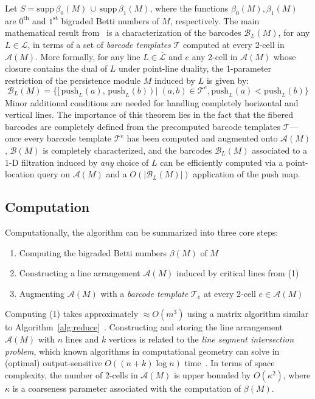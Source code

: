 \documentclass[sn-mathphys]{sn-jnl}
\begin{document}
Let $S = \mathrm{supp}\,\beta_0(M) \, \cup \, \mathrm{supp}\,\beta_1(M)$, where the functions $\beta_0(M), \beta_1(M)$ are $0^{\text{th}}$ and $1^{\text{st}}$ bigraded Betti numbers of $M$, respectively. 
The main mathematical result from~\cite{lesnick2015interactive} is a characterization of the barcodes $\mathcal{B}_L(M)$, for any $L \in \mathcal{L}$, in terms of a set of \emph{barcode templates} $\mathcal{T}$ computed at every 2-cell in $\mathcal{A}(M)$.
 More formally, for any line $L \in \overline{\mathcal{L}}$ and $e$ any 2-cell in $\mathcal{A}(M)$ whose closure contains the dual of $L$ under point-line duality, the 1-parameter restriction of the persistence module $M$ induced by $L$ is given by: 
 \begin{equation}
 \mathcal{B}_L(M) = \{ [\,\mathrm{push}_L(a), \, \mathrm{push}_L(b)\,) \mid (a,b) \in \mathcal{T}^e, \mathrm{push}_L(a) < \mathrm{push}_L(b)  \} 
\end{equation}
Minor additional conditions are needed for handling completely horizontal and vertical lines. 
The importance of this theorem lies in the fact that the fibered barcodes are completely defined from the precomputed barcode templates $\mathcal{T}$---once every barcode template $\mathcal{T}^e$ has been computed and augmented onto $\mathcal{A}(M)$, $\mathcal{B}(M)$ is completely characterized, and the barcodes $\mathcal{B}_L(M)$ associated to a 1-D filtration induced by \emph{any} choice of $L$ can be efficiently computed via a point-location query on $\mathcal{A}(M)$ and a $O(\lvert \mathcal{B}_L(M) \rvert)$ application of the push map.

\subsection{Computation}
Computationally, the algorithm can be summarized into three core steps: 
\begin{enumerate}
	\item Computing the bigraded Betti numbers $\beta(M)$ of $M$
	\item Constructing a line arrangement $\mathcal{A}(M)$ induced by critical lines from (1) 
	\item Augmenting $\mathcal{A}(M)$ with a \emph{barcode template} $\mathcal{T}_e$ at every 2-cell $e \in \mathcal{A}(M)$
\end{enumerate}
Computing (1) takes approximately $\approx O(m^3)$ using a matrix algorithm similar to Algorithm~\ref{alg:reduce}~\cite{lesnick2019computing}. Constructing and storing the line arrangement $\mathcal{A}(M)$ with $n$ lines and $k$ vertices is related to the \emph{line segment intersection problem}, which known algorithms in computational geometry can solve in (optimal) output-sensitive $O((n+k) \log n)$ time~\cite{boissonnat2000robust}. 
In terms of space complexity, the number of 2-cells in $\mathcal{A}(M)$ is upper bounded by $O(\kappa^2)$, where $\kappa$ is a coarseness parameter associated with the computation of $\beta(M)$. 
\end{document}
